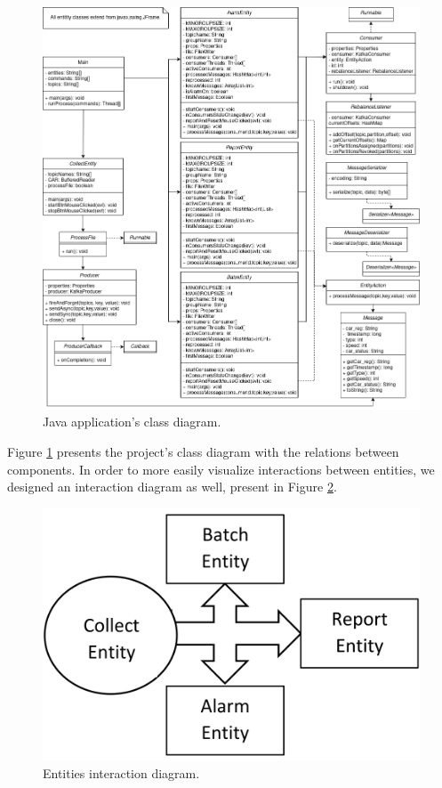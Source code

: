 \documentclass[12pt]{article}
\begin{document}
\begin{figure}[H]
  \centering
  \begin{minipage}{\textwidth}
    \centering
    \includegraphics[width=\linewidth]{img/ClassDiagram.png}
  \end{minipage}%
  \caption{Java application's class diagram.}
  \label{ClassDiagram}
\end{figure} 

Figure \ref{ClassDiagram} presents the project's class diagram with the relations between components.
In order to more easily visualize interactions between entities, we designed an interaction diagram as well, present in Figure \ref{InteractionDiagram}.

\begin{figure}[H]
  \centering
  \begin{minipage}{\textwidth}
    \centering
    \includegraphics[width=.5\linewidth]{img/BlockDiagram.png} 
  \end{minipage}%
  \caption{Entities interaction diagram.}
  \label{InteractionDiagram}
\end{figure} 
\end{document}
